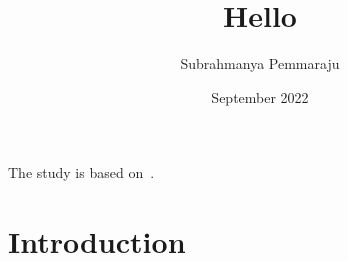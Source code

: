 \documentclass{article}
\title{Hello}
\author{Subrahmanya Pemmaraju}
\date{September 2022}
\begin{document}


The study is based on~\cite{rybka_90_2021}.



\maketitle

\section{Introduction}
\end{document}
